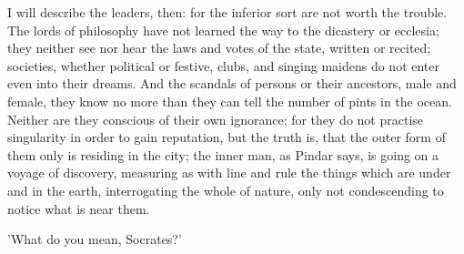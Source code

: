 \documentclass[11pt,letter]{article}
\begin{document}
\par  I will describe the leaders, then: for the inferior sort are not worth the trouble. The lords of philosophy have not learned the way to the dicastery or ecclesia; they neither see nor hear the laws and votes of the state, written or recited; societies, whether political or festive, clubs, and singing maidens do not enter even into their dreams. And the scandals of persons or their ancestors, male and female, they know no more than they can tell the number of pints in the ocean. Neither are they conscious of their own ignorance; for they do not practise singularity in order to gain reputation, but the truth is, that the outer form of them only is residing in the city; the inner man, as Pindar says, is going on a voyage of discovery, measuring as with line and rule the things which are under and in the earth, interrogating the whole of nature, only not condescending to notice what is near them.

\par  'What do you mean, Socrates?'
\end{document}
